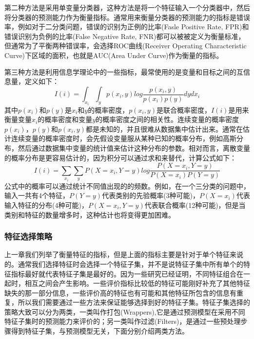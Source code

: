 第二种方法是采用单变量分类器，这种方法是将一个特征输入一个分类器中，然后将分类器的预测能力作为衡量指标。通常用来衡量分类器的预测能力的指标是错误率，例如对于二分类问题，错误的识别为正例的比率(Fasle Positive Rate, FPR)和错误识别为负例的比率(False Negative Rate, FNR)都可以被被定义为衡量标准，但通常为了平衡两种错误率，会选择ROC曲线(Receiver Operating Characteristic Curve)下区域的面积，也就是AUC(Area Under Curve)作为衡量的指标。

第三种方法是利用信息学理论中的一些指标，最常使用的是变量和目标之间的互信息量，定义如下：
\begin{equation}
\label{equ:mutual_info}
    I(i) = \int_{x_i}\int_{y}p(x_i, y)log\frac{p(x_i, y)}{p(x_i)p(y)}dydx_i
\end{equation}
其中$p(x_i)$和$p(y)$是$x_i$和$y$的概率密度，$p(x_i, y)$是联合概率密度，$I(i)$是用来衡量变量$x_i$的概率密度和变量$y$的概率密度之间的相关性。连续变量的概率密度$p(x_i)$，$p(y)$和$p(x_i, y)$都是未知的，并且很难从数据集中估计出来。通常在估计连续变量的概率密度时，会先假设变量服从某种已知的概率分布，例如高斯分布，然后通过数据集中变量的统计值来估计这种分布的参数。相对而言，离散变量的概率分布是更容易估计的，因为积分可以通过求和来替代，计算公式如下：
\begin{equation}
\label{equ:mutual_info_discrete}
    I(i) = \sum_{x_i}\sum_{y}P(X=x_i, Y=y)log\frac{P(X=x_i, Y=y)}{P(X=x_i)P(Y=y)}
\end{equation}
公式中的概率可以通过统计不同值出现的的频数。例如，在一个三分类的问题中，输入一共有4个特征，$P(Y=y)$代表类别的先验概率(3种可能)，$P(X=x_i)$代表输入特征的分布(4种可能)，$P(X=x_i, Y=y)$代表联合概率(12种可能)，但是当类别和特征的数量增多时，这种估计也将变得更加困难。

\subsubsection{特征选择策略}
上一章我们列举了衡量特征的指标，但是上面的指标主要是针对于单个特征来说的。通常我们选择特征时会选择一个特征子集，并不是说特征子集中所有单个的特征指标最好就代表特征子集是最好的。因为一些研究已经证明，不同特征组合在一起时，相互之间会产生影响。一些评价指标比较低的特征可能刚好补充了其他特征缺失的那一部分信息，一些评价高的特征也有可能和其他特征所包含的信息有重复，所以我们需要通过一些方法来保证能够选择到好的特征子集。特征子集选择的策略大致可以分为两类，一类叫作打包(Wrappers),它是通过预测模型在采用不同特征子集时的预测能力来评价的；另一类叫作过滤(Filters)，是通过一些预处理步骤得到特征子集，与预测模型无关，下面分别介绍两类方法。

